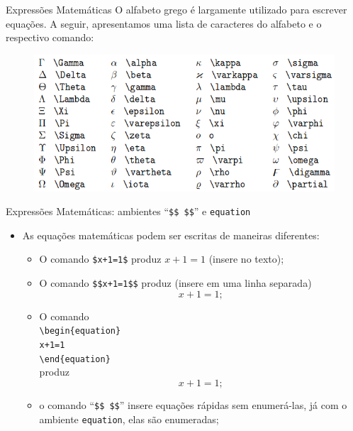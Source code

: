 \documentclass[c]{beamer}
\begin{document}
{\begin{frame}[fragile]{\sc Expressões Matemáticas}
O {\color{blue} alfabeto grego} é largamente utilizado para {\color{blue} escrever equações}.
A seguir, apresentamos uma lista de caracteres do alfabeto e o respectivo comando:
\begin{figure}[h]
	\centering
	\includegraphics[scale=0.46]{images/letras_gregas.png}
\end{figure}
\end{frame}



\begin{frame}[fragile]{\sc Expressões Matemáticas: ambientes ``\texttt{\$\$ \$\$}'' e \texttt{equation}}
	\begin{itemize}
		\setlength\itemsep{0.3cm}
	   \item As equações matemáticas podem ser escritas de maneiras diferentes:
	   \begin{itemize}
	   	\item O comando \verb|$x+1=1$| produz $x+1=1$ (insere no texto);
	   	\item O comando \verb|$$x+1=1$$| produz (insere em uma linha separada) $$x+1=1;$$
	   	\item O comando \\
	   	\verb|\begin{equation}|\\
	   	\verb|x+1=1|\\
	   	\verb|\end{equation}|\\  
	   	produz 
	   	\begin{equation}
	   	x+1=1;
	   	\end{equation}
	   	\item o comando {\color{blue} ``\verb|$$ $$|''} insere equações rápidas {\color{blue} sem enumerá-las}, 
	   	já com o ambiente {\color{blue} \verb|equation|}, elas são {\color{blue} enumeradas};
	   \end{itemize}
	\end{itemize}
\end{frame}



}
\end{document}
